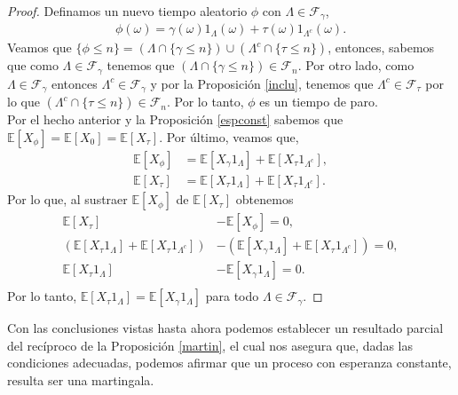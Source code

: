 \begin{proof}
\noindent Definamos un nuevo tiempo aleatorio $\phi$ con $\Lambda \in \mathcal{F}_{\gamma}$,
	\begin{align*}
		\phi(\omega) = \gamma(\omega)1_{\Lambda}(\omega) + \tau(\omega)1_{\Lambda^c}(\omega).
	\end{align*}
Veamos que $\{\phi \leq n\} = (\Lambda \cap \{\gamma \leq n\}) \cup (\Lambda^c \cap \{\tau \leq n\})$, entonces, sabemos que como $\Lambda \in \mathcal{F}_{\gamma}$ tenemos que $(\Lambda \cap \{\gamma \leq n\}) \in \mathcal{F}_n$. Por otro lado, como $\Lambda \in \mathcal{F}_{\gamma}$ entonces $\Lambda^c \in \mathcal{F}_{\gamma}$ y por la Proposición \ref{inclu}, tenemos que $\Lambda^c \in \mathcal{F}_{\tau}$ por lo que $(\Lambda^c \cap \{\tau \leq n\}) \in \mathcal{F}_n$. Por lo tanto, $\phi$ es un tiempo de paro.\\
	
Por el hecho anterior y la Proposición \ref{espconst} sabemos que $\mathbb{E}[X_{\phi}] =  \mathbb{E}[X_0] = \mathbb{E}[X_{\tau}]$. Por último, veamos que,
	\begin{align*}
		\mathbb{E}[X_{\phi}] & = \mathbb{E}[X_{\gamma}1_{\Lambda}] + \mathbb{E}[X_{\tau}1_{\Lambda^c}], \\
		\mathbb{E}[X_{\tau}] & = \mathbb{E}[X_{\tau}1_{\Lambda}] + \mathbb{E}[X_{\tau}1_{\Lambda^c}].
	\end{align*}
	Por lo que, al sustraer $\mathbb{E}[X_{\phi}]$ de $\mathbb{E}[X_{\tau}]$ obtenemos
	\begin{align*}
		\mathbb{E}[X_{\tau}] & - \mathbb{E}[X_{\phi}] = 0, \\
		(\mathbb{E}[X_{\tau}1_{\Lambda}] + \mathbb{E}[X_{\tau}1_{\Lambda^c}]) & - (\mathbb{E}[X_{\gamma}1_{\Lambda}] + \mathbb{E}[X_{\tau}1_{\Lambda^c}]) = 0, \\
		\mathbb{E}[X_{\tau}1_{\Lambda}] & - \mathbb{E}[X_{\gamma}1_{\Lambda}] = 0. \\
	\end{align*}
	Por lo tanto, $\mathbb{E}[X_{\tau}1_{\Lambda}] = \mathbb{E}[X_{\gamma}1_{\Lambda}]$ para todo $\Lambda \in \mathcal{F}_{\gamma}$.
\end{proof}

Con las conclusiones vistas hasta ahora podemos establecer un resultado parcial del recíproco de la Proposición \ref{martin}, el cual nos asegura que, dadas las condiciones adecuadas, podemos afirmar que un proceso con esperanza constante, resulta ser una martingala.

